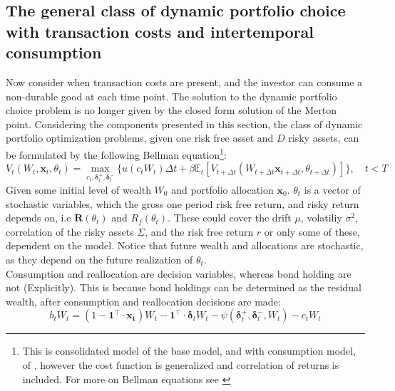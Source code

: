 \documentclass[11pt]{article}
\begin{document}
\subsection{The general class of dynamic portfolio choice with transaction costs and intertemporal consumption} \label{Subsection: Dynamic-portfolio-choice}
Now consider when transaction costs are present, and the investor can consume a non-durable good at each time point.
The solution to the dynamic portfolio choice problem is no longer given by the closed form solution of the Merton point.
Considering the components presented in this section,
the class of dynamic portfolio optimization problems, given one risk free asset and $D$ risky assets, can be formulated 
by the following Bellman equation\footnote{This is consolidated model of the base model, and with consumption model, of \autocite{CaiJuddXu2020},
however the cost function is generalized and correlation of returns is included. For more on Bellman equations see \autocite{Bellman1958}}:
\begin{equation} \label{eq: class_bellman_non_normalized}
  V_{t} (W_t , \mathbf{x}_{t}, \theta_t) = \max_{c_t , \boldsymbol{\delta}^{+}_{t}, \boldsymbol{\delta}^{-}_{t}  } \{ u(c_t W_t ) 
  \Delta t + \beta \mathbb{E}_{t} \left[ 
    V_{t+\Delta t} (W_{t+\Delta t } \mathbf{x}_{t+\Delta t }, \theta_{t + \Delta t }  ) 
    \right] \}, \quad t < T 
\end{equation}
Given some initial level of wealth $W_0$ and portfolio allocation $\mathbf{x}_0$. \( \theta_t \) is a vector of stochastic variables, which
the gross one period risk free return, and risky return depends on, i.e \( \mathbf{R}(\theta_t) \) and \( R_f (\theta_t) \).
These could cover the drift $\mu$, volatiliy $\sigma^{2}$, correlation of the risky assets $\Sigma$, and the risk free return $r$ or only some of these, dependent on the model.
Notice that future wealth and allocations are stochastic, as they depend on the future realization of $\theta_t$.\\
Consumption and reallocation are decision variables, whereas bond holding are not (Explicitly).
This is because bond holdings can be determined as the residual wealth, after consumption and reallocation decisions are made:
\begin{equation}\label{eq: class_bond_holdings_non_normalized}
  b_{t} W_t = \left( 1 - \mathbf{1}^{\top} \cdot \mathbf{x_t}  \right) W_t - \mathbf{1}^{\top} \cdot \boldsymbol{\delta}_t W_t 
  - \psi (\boldsymbol{\delta}^{+}_{t}, \boldsymbol{\delta}^{-}_t , W_t)
  - c_t W_t
\end{equation}
\end{document}
